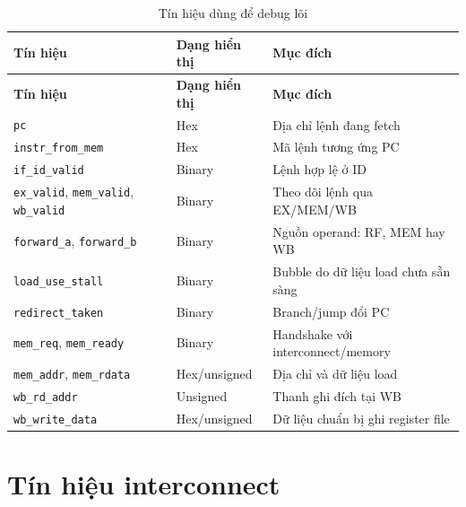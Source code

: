 \begin{longtable}{p{} p{} p{}}
\caption{Tín hiệu dùng để debug lõi}\label{tab:core_debug_signals}\\
\toprule
\textbf{Tín hiệu} & \textbf{Dạng hiển thị} & \textbf{Mục đích} \\
\midrule
\endfirsthead
\toprule
\textbf{Tín hiệu} & \textbf{Dạng hiển thị} & \textbf{Mục đích} \\
\midrule
\endhead
\texttt{pc} & Hex & Địa chỉ lệnh đang fetch \\
\texttt{instr\_from\_mem} & Hex & Mã lệnh tương ứng PC \\
\texttt{if\_id\_valid} & Binary & Lệnh hợp lệ ở ID \\
\texttt{ex\_valid}, \texttt{mem\_valid}, \texttt{wb\_valid} & Binary & Theo dõi lệnh qua EX/MEM/WB \\
\texttt{forward\_a}, \texttt{forward\_b} & Binary & Nguồn operand: RF, MEM hay WB \\
\texttt{load\_use\_stall} & Binary & Bubble do dữ liệu load chưa sẵn sàng \\
\texttt{redirect\_taken} & Binary & Branch/jump đổi PC \\
\texttt{mem\_req}, \texttt{mem\_ready} & Binary & Handshake với interconnect/memory \\
\texttt{mem\_addr}, \texttt{mem\_rdata} & Hex/unsigned & Địa chỉ và dữ liệu load \\
\texttt{wb\_rd\_addr} & Unsigned & Thanh ghi đích tại WB \\
\texttt{wb\_write\_data} & Hex/unsigned & Dữ liệu chuẩn bị ghi register file \\
\bottomrule
\end{longtable}

\section{Tín hiệu interconnect}

